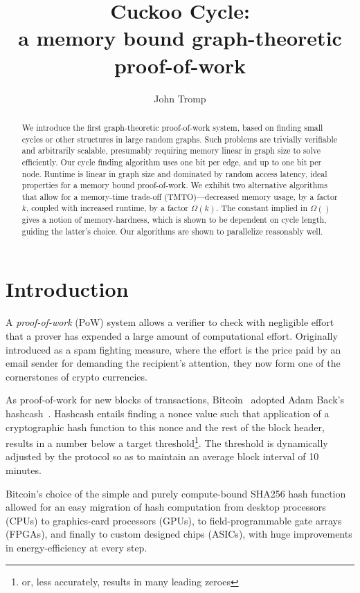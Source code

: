 \documentclass[11pt, oneside]{article}
\title{Cuckoo Cycle: \protect\\ a memory bound graph-theoretic proof-of-work}
\author{John Tromp}
\begin{document}
\maketitle

\begin{abstract}
We introduce the first graph-theoretic proof-of-work system,
based on finding small cycles or other structures in large random graphs.
Such problems are trivially verifiable and arbitrarily scalable, 
presumably requiring memory linear in graph size to solve efficiently.
Our cycle finding algorithm uses one bit per edge, and up to one bit per node.
Runtime is linear in graph size and dominated by random access latency,
ideal properties for a memory bound proof-of-work.
We exhibit two alternative algorithms that allow for a memory-time trade-off
(TMTO)---decreased memory usage, by a factor $k$, coupled with increased runtime, by a factor $\Omega(k)$.
The constant implied in $\Omega()$ gives a notion of memory-hardness, which is shown to be dependent
on cycle length, guiding the latter's choice. Our algorithms are shown to parallelize reasonably well.
\end{abstract}

\section{Introduction}
A {\em proof-of-work} (PoW) system allows a verifier to check with negligible
effort that a prover has expended a large amount of computational effort.
Originally introduced as a spam fighting measure, 
where the effort is the price paid by an email sender for demanding the
recipient's attention, they now form one of the cornerstones of crypto currencies.

As proof-of-work for new blocks of transactions,
Bitcoin~\cite{nakamoto2009bitcoin} adopted Adam Back's hashcash~\cite{back2002}.
Hashcash entails finding a nonce value such that application of a cryptographic hash function
to this nonce and the rest of the block header, results in a number below a
target threshold\footnote{or, less accurately, results in many leading zeroes}.
The threshold is dynamically adjusted by the protocol
so as to maintain an average block interval of 10 minutes.

Bitcoin's choice of the simple and purely compute-bound SHA256 hash function
allowed for an easy migration of hash computation from 
desktop processors (CPUs) to graphics-card processors (GPUs),
to field-programmable gate arrays (FPGAs), and finally to custom designed
chips (ASICs), with huge improvements in energy-efficiency at every step.
\end{document}
